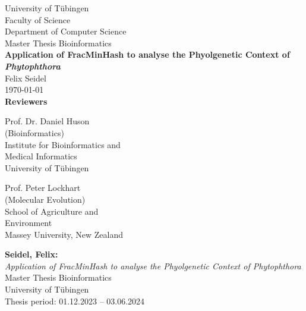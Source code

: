 \documentclass[twoside,12pt,a4paper]{report}
\begin{document}
 
\begin{titlepage}
 \begin{center}
  {\LARGE University of T\"ubingen}\\
  {\large Faculty of Science \\
 Department of Computer Science\\[4cm]}
  {\huge Master Thesis Bioinformatics\\[2cm]}
  {\Large\bf Application of FracMinHash to analyse the Phyolgenetic Context of \textit{Phytophthora}\\[1.5cm]}
 {\large Felix Seidel}\\[0.5cm]
  \today\\[3cm]
{\small\bf Reviewers}\\[0.5cm]
  \parbox{7cm}{\begin{center}{\large Prof. Dr. Daniel Huson}\\
   (Bioinformatics)\\
  {\footnotesize Institute for Bioinformatics and\\ Medical Informatics\\
	University of T\"ubingen}\end{center}}\hfill\parbox{7cm}{\begin{center}
  {\large Prof. Peter Lockhart}\\
  (Molecular Evolution)\\
  {\footnotesize School of Agriculture and\\ Environment\\
	Massey University, New Zealand}\end{center}
 }
  \end{center}
\end{titlepage}


\thispagestyle{empty}
\vspace*{\fill}
\begin{minipage}{11.2cm}
\textbf{Seidel, Felix:}\\
\emph{Application of FracMinHash to analyse the Phyolgenetic Context of Phytophthora}\\ Master Thesis Bioinformatics\\
University of T\"ubingen\\
Thesis period: 01.12.2023 -- 03.06.2024
\end{minipage}
\newpage
\end{document}
